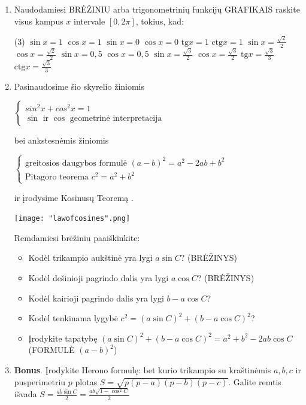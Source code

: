 \documentclass[a4paper]{article}
\newcommand{\tbf}[1]{\textbf{#1}}
\begin{document}
\begin{enumerate}
\item Naudodamiesi BRĖŽINIU arba trigonometrinių funkcijų GRAFIKAIS raskite visus kampus $x$ intervale $[0,2\pi]$, tokius, kad:
\begin{tasks}(3)
\task $\sin{x}=1$
\task $\cos{x}=1$
\task $\sin{x}=0$
\task $\cos{x}=0$
\task $\text{tg}{x}=1$
\task $\text{ctg}{x}=1$
\task $\sin{x}=\frac{\sqrt{2}}{2}$
\task $\cos{x}=\frac{\sqrt{2}}{2}$
\task $\sin{x}=0,5$
\task $\cos{x}=0,5$
\task $\sin{x}=\frac{\sqrt{3}}{2}$
\task $\cos{x}=\frac{\sqrt{3}}{2}$
\task $\text{tg}{x}=\frac{\sqrt{3}}{3}$
\task $\text{ctg}{x}=\frac{\sqrt{3}}{3}$
\end{tasks}
\item Pasinaudosime šio skyrelio žiniomis

$\begin{cases}sin^2x+cos^2x=1 \\ \sin\text{ ir }\cos \text{ geometrinė interpretacija} \end{cases}$ 

bei ankstesnėmis žiniomis 

$\begin{cases}\text{greitosios daugybos formulė }(a-b)^2=a^2-2ab+b^2 \\ \text{Pitagoro teorema } c^2=a^2+b^2\end{cases}$ 

ir įrodysime Kosinusų Teoremą .

\texttt{[image: "lawofcosines".png]}

Remdamiesi brėžiniu paaiškinkite:
\begin{itemize}
\item Kodėl trikampio aukštinė yra lygi $a\sin C$? (BRĖŽINYS)
\item Kodėl dešinioji pagrindo dalis yra lygi $a\cos C$? (BRĖŽINYS)
\item Kodėl kairioji pagrindo dalis yra lygi $b-a\cos C$?
\item Kodėl tenkinama lygybė $c^2=(a\sin C)^2+(b-a\cos C)^2$?
\item Įrodykite tapatybę $(a\sin C)^2+(b-a\cos C)^2=a^2+b^2-2ab\cos{C}$ (FORMULĖ $(a-b)^2$)
\end{itemize}
\item \tbf{Bonus}. Įrodykite Herono formulę: bet kurio trikampio su kraštinėmis $a, b, c$ ir pusperimetriu $p$ plotas $S=\sqrt{p(p-a)(p-b)(p-c)}$. Galite remtis išvada $S=\frac{ab\sin C}{2}=\frac{ab\sqrt{1-\cos^2C}}{2}$
\end{enumerate}
\newpage
\end{document}
